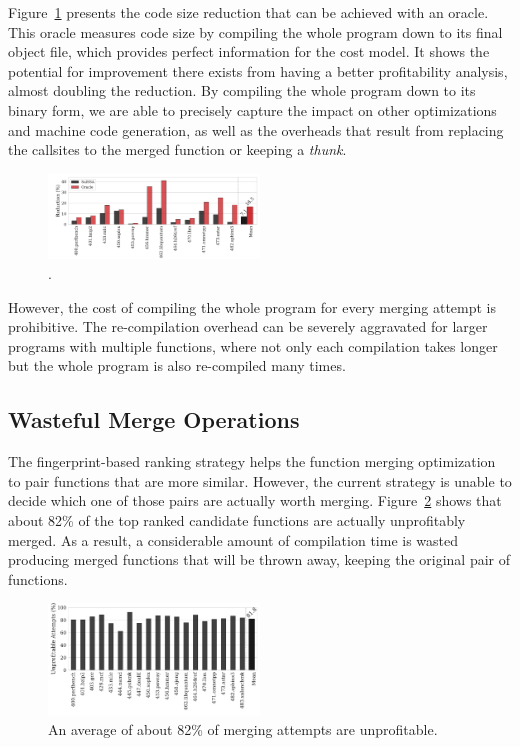 Figure~\ref{fig:oracle-reduction} presents the code size reduction that can be achieved with an oracle.
This oracle measures code size by compiling the whole program down to its final object file, which provides perfect information for the cost model.
It shows the potential for improvement there exists from having a better profitability analysis, almost doubling the reduction.
By compiling the whole program down to its binary form, we are able to precisely capture the impact on other optimizations and machine code generation, as well as the overheads that result from replacing the callsites to the merged function or keeping a \textit{thunk}.

\begin{figure}[h]
  \centering
  \includegraphics[width=0.5\textwidth]{figs/motivation-oracle-reduction.pdf}
  \vspace{-2.5em}
  \caption{.}
  \label{fig:oracle-reduction}
\end{figure}

However, the cost of compiling the whole program for every merging attempt is prohibitive.
The re-compilation overhead can be severely aggravated for larger programs with multiple functions, where not only each compilation takes longer but the whole program is also re-compiled many times.


\subsection{Wasteful Merge Operations}

The fingerprint-based ranking strategy helps the function merging optimization to pair functions that are more similar.
However, the current strategy is unable to decide which one of those pairs are actually worth merging.
Figure~\ref{fig:unprofitable-attempts} shows that about 82\% of the top ranked candidate functions are actually unprofitably merged.
As a result, a considerable amount of compilation time is wasted producing merged functions that will be thrown away, keeping the original pair of functions.

\begin{figure}[h]
  \centering
  \includegraphics[width=0.5\textwidth]{figs/unprofitable-attempts.pdf}
  \caption{An average of about 82\% of merging attempts are unprofitable.}
  \label{fig:unprofitable-attempts}
\end{figure}

